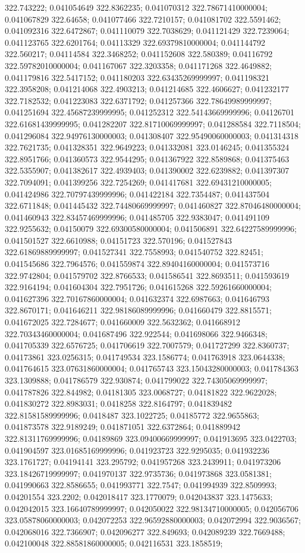 322.743222; 0.041054649 322.8362235; 0.041070312 322.78671410000004; 0.041067829 322.64658; 0.041077466 322.7210157; 0.041081702 322.5591462; 0.041092316 322.6472867; 0.041110079 322.7038629; 0.041121429 322.7239064; 0.041123765 322.6201764; 0.04113329 322.69379810000004; 0.041144792 322.560217; 0.04114584 322.3468252; 0.041152608 322.580389; 0.04116792 322.59782010000004; 0.041167067 322.3203358; 0.041171268 322.4649882; 0.041179816 322.5417152; 0.041180203 322.63435269999997; 0.041198321 322.3958208; 0.041214068 322.4903213; 0.041214685 322.4606627; 0.041232177 322.7182532; 0.041223083 322.6371792; 0.041257366 322.78649989999997; 0.041251694 322.45687239999995; 0.041252312 322.54143669999996; 0.04126701 322.61681439999995; 0.041282207 322.81710069999997; 0.041288584 322.7118504; 0.041296084 322.94976130000003; 0.041308407 322.95490060000003; 0.041314318 322.7621735; 0.041328351 322.9649223; 0.041332081 323.0146245; 0.041355324 322.8951766; 0.041360573 322.9544295; 0.041367922 322.8589868; 0.041375463 322.5355907; 0.041382617 322.4939403; 0.041390002 322.6239882; 0.041397307 322.7094091; 0.041399256 322.7254269; 0.041417681 322.69431210000005; 0.041424986 322.70797439999996; 0.041422184 322.7354487; 0.041437504 322.6711848; 0.041445432 322.74480669999997; 0.041460827 322.87046480000004; 0.041460943 322.83457469999996; 0.041485705 322.9383047; 0.041491109 322.9255632; 0.04150079 322.69300580000004; 0.041506891 322.64227589999996; 0.041501527 322.6610988; 0.04151723 322.570196; 0.041527843 322.61869889999997; 0.041527341 322.7558993; 0.041540752 322.82451; 0.041545686 322.7964576; 0.041559874 322.89404160000004; 0.041573716 322.9742804; 0.041579702 322.8766533; 0.041586541 322.8693511; 0.041593619 322.9164194; 0.041604304 322.7951726; 0.041615268 322.59261660000004; 0.041627396 322.70167860000004; 0.041632374 322.6987663; 0.041646793 322.8670171; 0.041646211 322.98186089999996; 0.041660479 322.8815571; 0.041672025 322.7284677; 0.041660009 322.5632362; 0.041668912 322.70343460000004; 0.041687496 322.922544; 0.041698066 322.9466348; 0.041705339 322.6576725; 0.041706619 322.7007579; 0.041727299 322.8360737; 0.04173861 323.0256315; 0.041749534 323.1586774; 0.041763918 323.0644338; 0.041764615 323.07631860000004; 0.041765743 323.15043280000003; 0.041784363 323.1309888; 0.041786579 322.930874; 0.041799022 322.74305069999997; 0.041787826 322.844982; 0.04181305 323.0068727; 0.04181822 322.9622028; 0.041830272 322.8983031; 0.0418258 322.8164797; 0.041839482 322.81581589999996; 0.0418487 323.1022725; 0.04185772 322.9655863; 0.041873578 322.9189249; 0.041871051 322.6372864; 0.041889942 322.81311769999996; 0.04189869 323.09400669999997; 0.041913695 323.0422703; 0.041904597 323.01685169999996; 0.041923723 322.9295035; 0.041932236 323.1761727; 0.04194141 323.295792; 0.041957268 323.2439911; 0.041973206 323.18426719999997; 0.041970137 322.9735736; 0.041973868 323.0581381; 0.041990663 322.8586655; 0.041993771 322.7547; 0.041994939 322.8509993; 0.04201554 323.2202; 0.042018417 323.1770079; 0.042043837 323.1475633; 0.042042015 323.16640789999997; 0.042050022 322.98134710000005; 0.042056706 323.05878060000003; 0.042072253 322.96592880000003; 0.042072994 322.9036567; 0.042068016 322.7366907; 0.042096277 322.849693; 0.042089239 322.7669488; 0.042100048 322.88581860000005; 0.042116531 323.1858519; 
